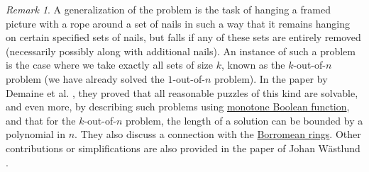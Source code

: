 \documentclass[11pt, a4paper, oneside]{article}
\theoremstyle{remark}
\newtheorem*{remark}{Remark}
\theoremstyle{lemma}
\begin{document}
\begin{remark}
  A generalization of the problem is the task of hanging a framed picture with a rope around a set of nails in such a way that it remains hanging on certain specified sets of nails, 
  but falls if any of these sets are entirely removed (necessarily possibly along with additional nails). An instance of such a problem is the case where we take exactly all sets of size $k$, known as the $k$-out-of-$n$ problem (we have already solved the $1$-out-of-$n$ problem). In the paper by Demaine et al. \cite{demaine2012picture}, they proved that all reasonable puzzles of this kind are solvable, and even more, by describing such problems using \href{https://en.wikipedia.org/wiki/Monotonic_function#:~:text=In%20Boolean%20functions,-With%20the%20nonmonotonic&text=In%20Boolean%20algebra%2C%20a%20monotonic,..%2C%20bn}{monotone Boolean function}, and that for the $k$-out-of-$n$ problem, the length of a solution can be bounded by a polynomial in $n$. 
  They also discuss a connection with the \href{https://en.wikipedia.org/wiki/Borromean_rings}{Borromean rings}. Other contributions or simplifications are also provided in the paper of Johan Wästlund \cite{wastlund2021faulty}.
\end{remark}

\newpage
\appendix
\newpage
\section{}
\end{document}
